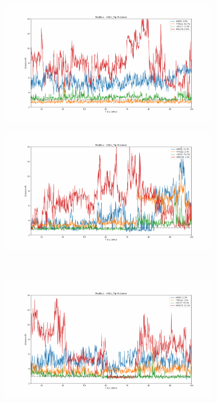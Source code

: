 \begin{figure}[!ht]
\centering
  \begin{subfigure}{.45\textwidth}
     \centering
     \includegraphics[width=.95\linewidth]{chapter4/2AZU_flip/2AZU_flip-dist_0.pdf}
  \end{subfigure}
  \begin{subfigure}{.45\textwidth}
     \centering
     \includegraphics[width=.95\linewidth]{chapter4/2AZU_flip/2AZU_flip-dist_1.pdf}
  \end{subfigure}
  \\
  \begin{subfigure}{.45\textwidth}
     \centering
     \includegraphics[width=.95\linewidth]{chapter4/2AZU_flip/2AZU_flip-dist_2.pdf}

\end{subfigure}
\end{figure}
